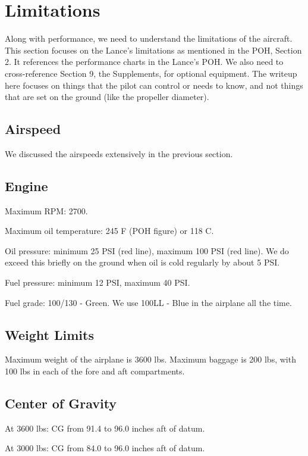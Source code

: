 \section{Limitations}

Along with performance, we need to understand the limitations of the aircraft. This section focuses on the Lance's limitations as mentioned in the POH, Section 2. It references the performance charts in the Lance's POH. We also need to cross-reference Section 9, the Supplements, for optional equipment. The writeup here focuses on things that the pilot can control or needs to know, and not things that are set on the ground (like the propeller diameter).

\subsection{Airspeed}

We discussed the airspeeds extensively in the previous section.

\subsection{Engine}

Maximum RPM: 2700.

Maximum oil temperature: 245 F (POH figure) or 118 C.

Oil pressure: minimum 25 PSI (red line), maximum 100 PSI (red line). We do exceed this briefly on the ground when oil is cold regularly by about 5 PSI.

Fuel pressure: minimum 12 PSI, maximum 40 PSI.

Fuel grade: 100/130 - Green. We use 100LL - Blue in the airplane all the time.

\subsection{Weight Limits}

Maximum weight of the airplane is 3600 lbs. Maximum baggage is 200 lbs, with 100 lbs in each of the fore and aft compartments.

\subsection{Center of Gravity}

At 3600 lbs: CG from 91.4 to 96.0 inches aft of datum.

At 3000 lbs: CG from 84.0 to 96.0 inches aft of datum.

